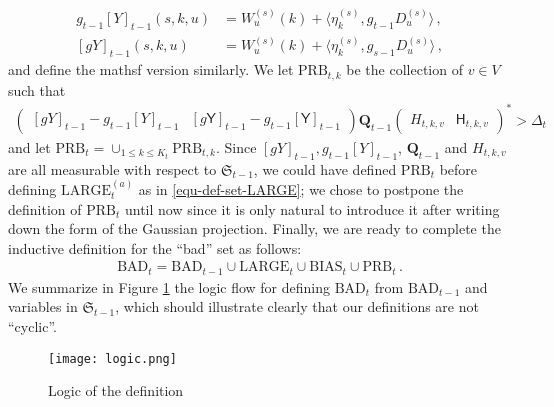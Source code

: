 \documentclass[11pt]{article}
\numberwithin{equation}{section}
\begin{document}
\begin{align*}
g_{t-1}[Y]_{t-1} (s,k,u)& =  W^{(s)}_u(k) + \langle \eta^{(s)}_k, g_{t-1} D^{(s)}_u \rangle\,,\\ 
[g Y]_{t-1} (s,k,u) &= W^{(s)}_u(k) + \langle \eta^{(s)}_k, g_{s-1} D^{(s)}_u \rangle\,,
\end{align*}  
and define the mathsf version similarly.
We let $\mathrm{PRB}_{t,k} $ be the collection of $v\in V$ such that
\begin{align} 
    \begin{pmatrix}
    [gY]_{t-1} - g_{t-1}[Y]_{t-1} & [g\mathsf{Y}]_{t-1} - g_{t-1}[\mathsf{Y}]_{t-1}
    \end{pmatrix}  \mathbf{Q}_{t-1}
    \begin{pmatrix}
        H_{t,k,v} & \mathsf{H}_{t,k,v}
    \end{pmatrix}^{*} > \Delta_{t}
    \label{equ-def-set-PRB}
\end{align}
and let $\mathrm{PRB}_{t} = \cup_{1 \leq k \leq K_t} \mathrm{PRB}_{t,k}$. Since $[g Y]_{t-1}, g_{t-1}[Y]_{t-1}$, $\mathbf{Q}_{t-1}$ and $H_{t,k,v}$ are all measurable with respect to $\mathfrak{S}_{t-1}$,  we could have defined $\mathrm{PRB}_t$ before defining $\mathrm{LARGE}^{(a)}_t$ as in \eqref{equ-def-set-LARGE}; we chose to postpone the definition of $\mathrm{PRB}_t$ until now since it is only natural to introduce it after writing down the form of the Gaussian projection. 
Finally, we are ready to complete the inductive definition for the ``bad'' set as follows:
\begin{align}
    \mathrm{BAD}_{t} = \mathrm{BAD}_{t-1} \cup \mathrm{LARGE}_t \cup \mathrm{BIAS}_{t} \cup \mathrm{PRB}_t \,.  \label{equ-def-set-BAD} 
\end{align}
We summarize in Figure \ref{fig:logic} the logic flow for defining $\mathrm{BAD}_t$ from $\mathrm{BAD}_{t-1}$ and variables in $\mathfrak{S}_{t-1}$, which should illustrate clearly that our definitions are not ``cyclic''.
\begin{figure}[!ht]
    \centering
    \vspace{-2cm}
    \texttt{[image: logic.png]}
    \caption{Logic of the definition}
    \label{fig:logic}
\end{figure}
\end{document}

